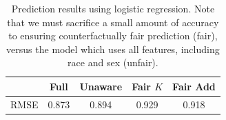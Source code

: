
\begin{table}
\centering
\caption{Prediction results using logistic regression. Note that we must sacrifice a small amount of accuracy to ensuring counterfactually fair prediction (fair), versus the model which uses all features, including race and sex (unfair).}\label{table.pred_law}
\begin{tabular}{ccccc} 
\hline
 &  {\bf Full} & {\bf Unaware} & {\bf Fair $K$} & {\bf Fair Add} \\
\hline
RMSE & 0.873 & 0.894 & 0.929 & 0.918 \\
\hline
\end{tabular}
\end{table}

